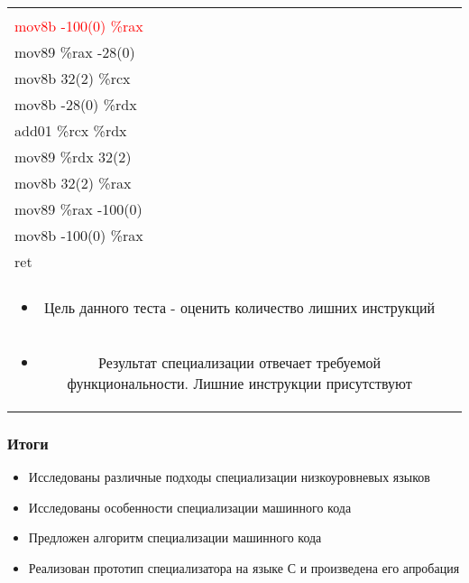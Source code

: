 \documentclass{beamer}
\begin{document}
\begin{frame}[fragile]
\begin{tabular}{l  c  r}
{\begin{minipage}[c]{0.4\textwidth}
{\textcolor{red}{mov89 \%rax  -100(0)}\\ 
\textcolor{red}{mov8b -100(0)  \%rax}\\ 
\textcolor{ao}{mov89 \%rax  -28(0)}\\ 
\textcolor{ao}{mov8b 32(2)  \%rcx}\\ 
\textcolor{ao}{mov8b -28(0)  \%rdx}\\ 
\textcolor{ao}{add01 \%rcx  \%rdx}\\ 
\textcolor{ao}{mov89 \%rdx  32(2)}\\ 
mov8b 32(2)  \%rax \\
mov89 \%rax  -100(0)\\ 
mov8b -100(0)  \%rax \\
ret\\
}
\vspace*{20mm}
\end{minipage}
}\\
 \multicolumn{2}{c}{
\begin{minipage}[c]{0.7\textwidth}
\begin{itemize}
\vfill
\item Цель данного теста - 
оценить количество лишних инструкций
\vspace*{5mm}
\end{itemize}
\end{minipage}}
 & \\
\multicolumn{2}{c}{
\begin{minipage}[c]{0.7\textwidth}
\begin{itemize}
\vfill
\item Результат специализации отвечает требуемой функциональности. Лишние инструкции присутствуют
\end{itemize}
\end{minipage}}  & \\
\end{tabular}
\vfill
\end{frame}


\begin{frame}\frametitle{Итоги}
\begin{itemize}
\item Исследованы различные подходы специализации низкоуровневых языков
\vfill
\item Исследованы особенности специализации машинного кода
\vfill
\item Предложен алгоритм специализации машинного кода
\vfill
\item Реализован прототип специализатора на языке С и произведена его апробация
\vfill
\end{itemize}
\end{frame}
\end{document}
